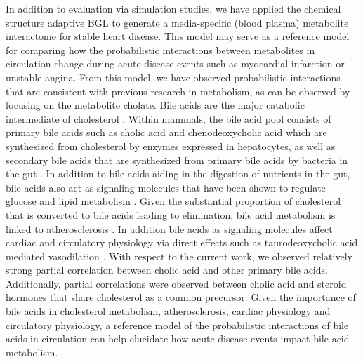 \begin{DoubleSpace*}
In addition to evaluation via simulation studies, we have applied the chemical structure adaptive BGL to generate a media-specific (blood plasma) metabolite interactome for stable heart disease. This model may serve as a reference model for comparing how the probabilistic interactions between metabolites in circulation change during acute disease events such as myocardial infarction or unstable angina. From this model, we have observed probabilistic interactions that are consistent with previous research in metabolism, as can be observed by focusing on the metabolite cholate. Bile acids are the major catabolic intermediate of cholesterol \cite{russell2003}. Within mammals, the bile acid pool consists of primary bile acids such as cholic acid and chenodeoxycholic acid which are synthesized from cholesterol by enzymes expressed in hepatocytes, as well as secondary bile acids that are synthesized from primary bile acids by bacteria in the gut \cite{garcia2012,hofmann2010,russell2003}. In addition to bile acids aiding in the digestion of nutrients in the gut, bile acids also act as signaling molecules that have been shown to regulate glucose and lipid metabolism \cite{ferrebee2015,khurana2011}. Given the substantial proportion of cholesterol that is converted to bile acids leading to elimination, bile acid metabolism is linked to atherosclerosis \cite{meissner2013}. In addition bile acids as signaling molecules affect cardiac \cite{desai2017,rainer2013} and circulatory physiology \cite{khurana2011} via direct effects such as taurodeoxycholic acid mediated vasodilation \cite{khurana2005}. With respect to the current work, we observed relatively strong partial correlation between cholic acid and other primary bile acids. Additionally, partial correlations were observed between cholic acid and steroid hormones that share cholesterol as a common precursor. Given the importance of bile acids in cholesterol metabolism, atherosclerosis, cardiac physiology and circulatory physiology, a reference model of the probabilistic interactions of bile acids in circulation can help elucidate how acute disease events impact bile acid metabolism.


\end{DoubleSpace*}
